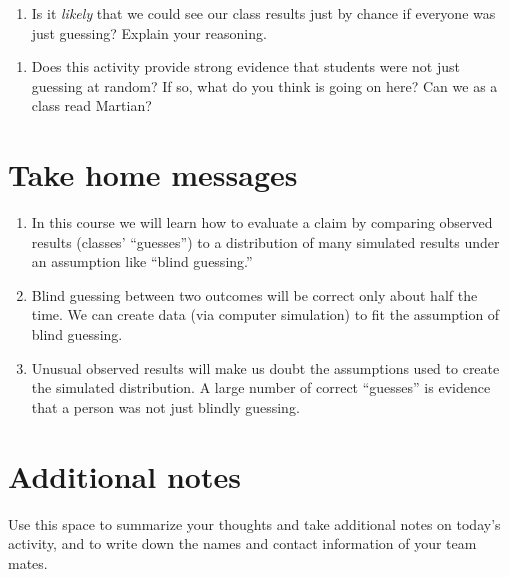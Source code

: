\documentclass[
]{report}
\providecommand{\tightlist}{%
  \setlength{\itemsep}{0pt}\setlength{\parskip}{0pt}}
\begin{document}
\vspace{1in}

\begin{enumerate}
\def\labelenumi{\arabic{enumi}.}
\setcounter{enumi}{16}
\tightlist
\item
  Is it \emph{likely} that we could see our class results just by chance if everyone was just guessing? Explain your reasoning.
\end{enumerate}

\vspace{1in}

\begin{enumerate}
\def\labelenumi{\arabic{enumi}.}
\setcounter{enumi}{17}
\tightlist
\item
  Does this activity provide strong evidence that students were not just guessing at random? If so, what do you think is going on here? Can we as a class read Martian?
\end{enumerate}

\vspace{1in}

\hypertarget{take-home-messages}{%
\section{Take home messages}\label{take-home-messages}}

\begin{enumerate}
\def\labelenumi{\arabic{enumi}.}
\item
  In this course we will learn how to evaluate a claim by comparing observed results (classes' ``guesses'') to a distribution of many simulated results under an assumption like ``blind guessing.''
\item
  Blind guessing between two outcomes will be correct only about half the time. We can create data (via computer simulation) to fit the assumption of blind guessing.
\item
  Unusual observed results will make us doubt the assumptions used to create the simulated distribution. A large number of correct ``guesses'' is evidence that a person was not just blindly guessing.
\end{enumerate}

\hypertarget{additional-notes}{%
\section{Additional notes}\label{additional-notes}}

Use this space to summarize your thoughts and take additional notes on today's activity, and to write down the names and contact information of your team mates.
\end{document}
